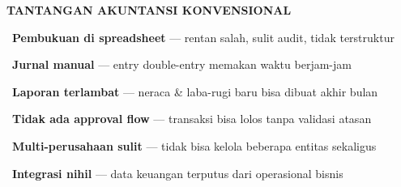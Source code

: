 \documentclass[a4paper]{article}
\begin{document}
\noindent
\begin{minipage}[t]{0.485\textwidth}
    \colorbox{RedLight}{%
        \begin{minipage}{\dimexpr\textwidth-14pt}
            \vspace{5pt}
            {\fontsize{10}{13}\selectfont\bfseries\color{RedText} TANTANGAN AKUNTANSI KONVENSIONAL}
            \vspace{5pt}
        \end{minipage}}
    \vspace{6pt}

    {\fontsize{9.5}{13}\selectfont\color{TextDark}%
    \textbullet\ \textbf{Pembukuan di spreadsheet} — rentan salah, sulit audit, tidak terstruktur\par\vspace{4pt}%
    \textbullet\ \textbf{Jurnal manual} — entry double-entry memakan waktu berjam-jam\par\vspace{4pt}%
    \textbullet\ \textbf{Laporan terlambat} — neraca \& laba-rugi baru bisa dibuat akhir bulan\par\vspace{4pt}%
    \textbullet\ \textbf{Tidak ada approval flow} — transaksi bisa lolos tanpa validasi atasan\par\vspace{4pt}%
    \textbullet\ \textbf{Multi-perusahaan sulit} — tidak bisa kelola beberapa entitas sekaligus\par\vspace{4pt}%
    \textbullet\ \textbf{Integrasi nihil} — data keuangan terputus dari operasional bisnis}%
\end{minipage}%
\hfill%
\end{document}
